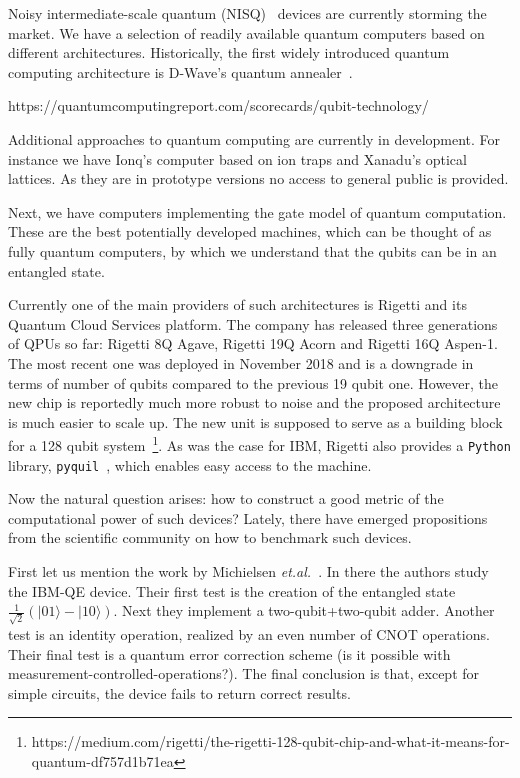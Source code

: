 \documentclass[preprint,12pt, a4paper]{elsarticle}
\newcommand{\ket}[1]{\ensuremath{|#1\rangle}}
\newcommand{\1}{{\rm 1\hspace{-0.9mm}l}}
\begin{document}
Noisy intermediate-scale quantum
(NISQ)~\cite{preskill} devices are currently storming the market. We
have a selection of readily available quantum computers based on different
architectures. Historically, the first widely introduced quantum computing
architecture is D-Wave's quantum annealer~\cite{}. 

https://quantumcomputingreport.com/scorecards/qubit-technology/

Additional approaches to quantum computing are currently in development. For 
instance we have Ionq's computer based on ion traps and Xanadu's optical 
lattices. As they are in prototype versions no access to general public is 
provided. 

Next, we have computers implementing the gate model of quantum computation.
These are the best potentially developed machines, which can be thought
of as fully quantum computers, by which we understand that the qubits can be in
an entangled state. 

Currently one of the main providers of such architectures is Rigetti and its 
Quantum Cloud Services platform. The company has
released three generations of QPUs so far: Rigetti 8Q Agave, Rigetti 19Q Acorn
and Rigetti 16Q Aspen-1. The most recent one was deployed in November 2018 and
is a downgrade in terms of number of qubits compared to the previous 19 qubit
one. However, the new chip is reportedly much more robust to noise and the
proposed architecture is much easier to scale up. The new unit is supposed to
serve as a building block for a 128 qubit
system~\footnote{https://medium.com/rigetti/the-rigetti-128-qubit-chip-and-what-it-means-for-quantum-df757d1b71ea}.
As was the case for IBM, Rigetti also provides a \texttt{Python} library, 
\texttt{pyquil}~\cite{}, which enables easy access to the machine.



%
%	


Now the natural question arises: how to construct a good metric of the
computational power of such devices? 
Lately, there have emerged propositions from the scientific community on how to
benchmark such devices.

 First let us mention the work by Michielsen
\emph{et.al.}~\cite{michielsen2017benchmarking}. In there the authors study the
IBM-QE device. Their first test is the creation of the entangled state
$\frac{1}{\sqrt{2}} (\ket{01} - \ket{10})$. Next they implement a
two-qubit+two-qubit adder. Another test is an identity operation, realized by an
even number of CNOT operations. Their final test is a quantum error correction
scheme (is it possible with measurement-controlled-operations?). The final
conclusion is that, except for simple circuits, the device fails to return
correct results.
\end{document}

